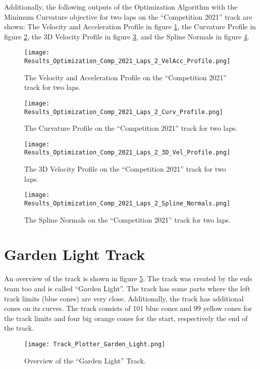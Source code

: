Additionally, the following outputs of the Optimization Algorithm with the Minimum Curvature objective for two laps on the ``Competition 2021'' track are shown: The Velocity and Acceleration Profile in figure \ref{fig:Results Comp 2021 Laps 2 VelAcc Profile}, the Curvature Profile in figure \ref{fig:Results Comp 2021 Laps 2 Curv Profile}, the 3D Velocity Profile in figure \ref{fig:Results Comp 2021 Laps 2 3D Vel Profile}, and the Spline Normals in figure \ref{fig:Results Comp 2021 Laps 2 Spline Normals}.
\begin{figure}[H]
    \centering
    \texttt{[image: Results\_Optimization\_Comp\_2021\_Laps\_2\_VelAcc\_Profile.png]}
    \caption{The Velocity and Acceleration Profile on the ``Competition 2021'' track for two laps.}
    \label{fig:Results Comp 2021 Laps 2 VelAcc Profile}
\end{figure}
\begin{figure}[H]
    \centering
    \texttt{[image: Results\_Optimization\_Comp\_2021\_Laps\_2\_Curv\_Profile.png]}
    \caption{The Curvature Profile on the ``Competition 2021'' track for two laps.}
    \label{fig:Results Comp 2021 Laps 2 Curv Profile}
\end{figure}
\begin{figure}[H]
    \centering
    \texttt{[image: Results\_Optimization\_Comp\_2021\_Laps\_2\_3D\_Vel\_Profile.png]}
    \caption{The 3D Velocity Profile on the ``Competition 2021'' track for two laps.}
    \label{fig:Results Comp 2021 Laps 2 3D Vel Profile}
\end{figure}
\begin{figure}[H]
    \centering
    \texttt{[image: Results\_Optimization\_Comp\_2021\_Laps\_2\_Spline\_Normals.png]}
    \caption{The Spline Normals on the ``Competition 2021'' track for two laps.}
    \label{fig:Results Comp 2021 Laps 2 Spline Normals}
\end{figure}

\pagebreak

\section{Garden Light Track} \label{sec:Results Garden Light Track}
An overview of the track is shown in figure \ref{fig:Results Garden Light Initial}. The track was created by the \acrshort{eufs} team too and is called ``Garden Light''. \cite{eufs_sim_gitlab} The track has some parts where the left track limits (blue cones) are very close. Additionally, the track has additional cones on its curves. The track consists of 101 blue cones and 99 yellow cones for the track limits and four big orange cones for the start, respectively the end of the track.
\begin{figure}[H]
    \centering
    \texttt{[image: Track\_Plotter\_Garden\_Light.png]}
    \caption{Overview of the ``Garden Light'' Track.}
    \label{fig:Results Garden Light Initial}
\end{figure}

